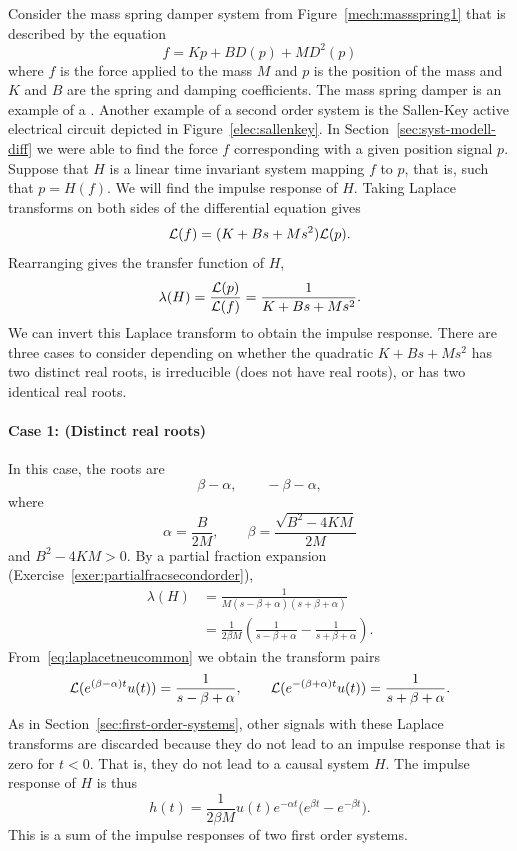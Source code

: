 Consider the mass spring damper system from Figure~\ref{mech:massspring1} that is described by the equation
\begin{equation}\label{eq:masspringeqseclapltrans}
f = K p + B D(p) + M D^2(p)
\end{equation}
where $f$ is the force applied to the mass $M$ and $p$ is the position of the mass and $K$ and $B$ are the spring and damping coefficients.  The mass spring damper is an example of a .  Another example of a second order system is the Sallen-Key active electrical circuit depicted in Figure~\ref{elec:sallenkey}.  In Section~\ref{sec:syst-modell-diff} we were able to find the force $f$ corresponding with a given position signal $p$.  Suppose that $H$ is a linear time invariant system mapping $f$ to $p$, that is, such that $p = H(f)$.  We will find the impulse response of $H$.  Taking Laplace transforms on both sides of the differential equation gives
\[
\mathcal L(f) = (K + B s + M s^2) \mathcal L(p).
\]
Rearranging gives the transfer function of $H$,
\[
\lambda(H) = \frac{\mathcal L(p)}{\mathcal L(f)} =  \frac{1}{K + B s + M s^2}.
\]
We can invert this Laplace transform to obtain the impulse response.  There are three cases to consider depending on whether the quadratic $K + Bs + Ms^2$ has two distinct real roots, is irreducible (does not have real roots), or has two identical real roots.

\paragraph{Case 1: (Distinct real roots)}
In this case, the roots are
\[
\beta-\alpha, \qquad  -\beta-\alpha,
\] 
where 
\[
\alpha = \frac{B}{2M}, \qquad  \beta = \frac{\sqrt{B^2 - 4KM}}{2M}
\]
and $B^2 - 4KM > 0$.  By a partial fraction expansion (Exercise~\ref{exer:partialfracsecondorder}),
\begin{align*}
\lambda(H) &= \frac{1}{M(s - \beta+\alpha)(s + \beta + \alpha)} \\
&= \frac{1}{2\beta M}\left( \frac{1}{s-\beta+\alpha} - \frac{1}{s+\beta+\alpha} \right).
\end{align*}
From~\eqref{eq:laplacetneucommon} we obtain the transform pairs
\[
\mathcal L(e^{(\beta-\alpha)t} u(t)) = \frac{1}{s-\beta+\alpha}, \qquad \mathcal L(e^{-(\beta+\alpha) t} u(t)) = \frac{1}{s+\beta+\alpha}.
\]
As in Section~\ref{sec:first-order-systems}, other signals with these Laplace transforms are discarded because they do not lead to an impulse response that is zero for $t < 0$.  That is, they do not lead to a causal system $H$.  The impulse response of $H$ is thus
\[
h(t) = \frac{1}{2 \beta M} u(t) e^{-\alpha t} \big( e^{\beta t} - e^{-\beta t} \big).
\]
This is a sum of the impulse responses of two first order systems.


